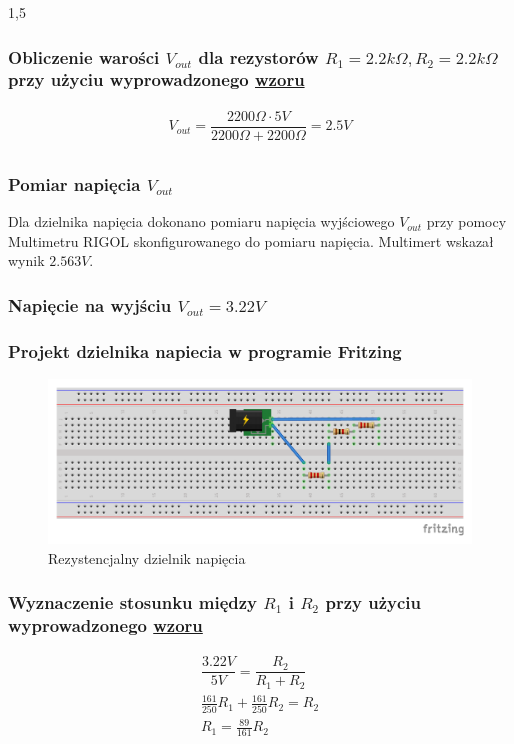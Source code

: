 \documentclass[polish,polish,a4paper]{article}
\begin{document}
\begin{spacing}{1,5}
		\subsubsection*{Obliczenie warości $ V_{out}$ dla rezystorów $ R_{1} = 2.2k\Omega, R_{2} =2.2k\Omega  $  przy użyciu wyprowadzonego \hyperref[eq:vout]{wzoru}}
		\begin{gather*}
		V_{out} = \dfrac{2200\Omega \cdot 5V}{2200\Omega + 2200\Omega} = 2.5V\\
		\end{gather*}
		\subsubsection*{Pomiar napięcia $ V_{out} $}
		Dla dzielnika napięcia dokonano pomiaru napięcia wyjściowego $ V_{out} $ przy pomocy Multimetru RIGOL skonfigurowanego do pomiaru napięcia. Multimert wskazał wynik $2.563V$.
		
		
		
		\subsubsection{Napięcie na wyjściu $V_{out} =  3.22V $}
		\subsubsection*{Projekt dzielnika napiecia w programie Fritzing}
		
		\begin{figure}[H]
			\centering
			\includegraphics[scale=0.9]{3_22_bb.pdf}
			\caption{Rezystencjalny dzielnik napięcia}
			\label{fig:pod3_22}
		\end{figure}
		
		\subsubsection*{Wyznaczenie stosunku między $ R_{1} $ i $ R_{2} $ przy użyciu wyprowadzonego \hyperref[eq:vout]{wzoru}}
		\begin{gather*}
		\dfrac{3.22V}{5V} = \dfrac{R_{2}}{R_{1} + R_{2}}\\
		\frac{161}{250} R_{1} + \frac{161}{250}R_{2} = R_{2}\\
		R_{1} =\frac{89}{161} R_{2}\\
		\end{gather*}

\end{spacing}
\end{document}
